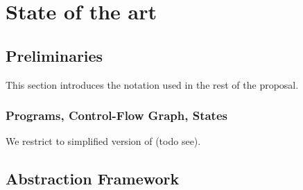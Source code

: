 \chapter{State of the art}
\label{ch:state}



%
%


\section{Preliminaries}

This section introduces the notation used in the rest of the proposal.

\subsection{Programs, Control-Flow Graph, States}

We restrict to simplified version of \llvm (todo see).






\section{Abstraction Framework}




